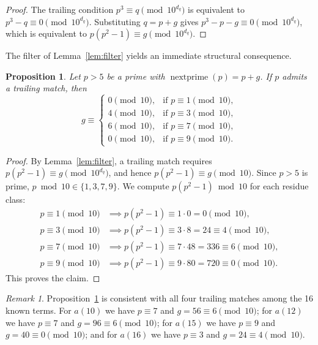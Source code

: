 \documentclass[11pt]{article}
\newtheorem{proposition}{Proposition}
\theoremstyle{definition}
\theoremstyle{remark}
\newtheorem{remark}{Remark}
\newcommand{\np}{\operatorname{nextprime}}
\begin{document}
\begin{proof}
The trailing condition $p^3 \equiv q \pmod{10^{d_q}}$ is equivalent
to $p^3 - q \equiv 0 \pmod{10^{d_q}}$.
Substituting $q = p + g$ gives
$p^3 - p - g \equiv 0 \pmod{10^{d_q}}$,
which is equivalent to $p(p^2 - 1) \equiv g \pmod{10^{d_q}}$.
\end{proof}

The filter of Lemma~\ref{lem:filter} yields an immediate structural
consequence.

\begin{proposition}
\label{prop:mod10}
Let $p > 5$ be a prime with $\np(p) = p + g$.
If $p$ admits a trailing match, then
\[
 g \equiv \begin{cases}
 0 \pmod{10}, & \text{if } p \equiv 1 \pmod{10}, \\
 4 \pmod{10}, & \text{if } p \equiv 3 \pmod{10}, \\
 6 \pmod{10}, & \text{if } p \equiv 7 \pmod{10}, \\
 0 \pmod{10}, & \text{if } p \equiv 9 \pmod{10}.
 \end{cases}
\]
\end{proposition}

\begin{proof}
By Lemma~\ref{lem:filter}, a trailing match requires
$p(p^2 - 1) \equiv g \pmod{10^{d_q}}$, and hence
$p(p^2 - 1) \equiv g \pmod{10}$.
Since $p > 5$ is prime, $p \bmod 10 \in \{1, 3, 7, 9\}$.
We compute $p(p^2 - 1) \bmod 10$ for each residue class:
\begin{align*}
 p \equiv 1 \pmod{10} &\implies p(p^2 - 1) \equiv 1 \cdot 0 = 0 \pmod{10}, \\
 p \equiv 3 \pmod{10} &\implies p(p^2 - 1) \equiv 3 \cdot 8 = 24 \equiv 4 \pmod{10}, \\
 p \equiv 7 \pmod{10} &\implies p(p^2 - 1) \equiv 7 \cdot 48 = 336 \equiv 6 \pmod{10}, \\
 p \equiv 9 \pmod{10} &\implies p(p^2 - 1) \equiv 9 \cdot 80 = 720 \equiv 0 \pmod{10}.
\end{align*}
This proves the claim.
\end{proof}

\begin{remark}
Proposition~\ref{prop:mod10} is consistent with all four trailing
matches among the 16 known terms.
For $a(10)$ we have $p \equiv 7$ and $g = 56 \equiv 6 \pmod{10}$;
for $a(12)$ we have $p \equiv 7$ and $g = 96 \equiv 6 \pmod{10}$;
for $a(15)$ we have $p \equiv 9$ and $g = 40 \equiv 0 \pmod{10}$;
and for $a(16)$ we have $p \equiv 3$ and $g = 24 \equiv 4 \pmod{10}$.
\end{remark}
\end{document}
